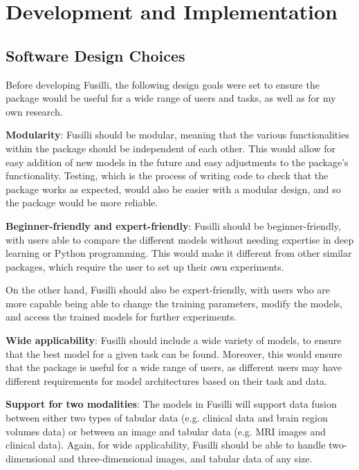 \section{Development and Implementation}

\subsection{Software Design Choices}

Before developing Fusilli, the following design goals were set to ensure the package would be useful for a wide range of users and tasks, as well as for my own research.
\vspace{0.3cm}

\noindent\textbf{Modularity}: Fusilli should be modular, meaning that the various functionalities within the package should be independent of each other.
This would allow for easy addition of new models in the future and easy adjustments to the package's functionality.
Testing, which is the process of writing code to check that the package works as expected, would also be easier with a modular design, and so the package would be more reliable.

\vspace{0.3cm}

\noindent\textbf{Beginner-friendly and expert-friendly}:  Fusilli should be beginner-friendly, with users able to compare the different models without needing expertise in deep learning or Python programming.
This would make it different from other similar packages, which require the user to set up their own experiments.

On the other hand, Fusilli should also be expert-friendly, with users who are more capable being able to change the training parameters, modify the models, and access the trained models for further experiments.

\vspace{0.3cm}

\noindent\textbf{Wide applicability}:
Fusilli should include a wide variety of models, to ensure that the best model for a given task can be found.
Moreover, this would ensure that the package is useful for a wide range of users, as different users may have different requirements for model architectures based on their task and data.

\vspace{0.3cm}

\noindent\textbf{Support for two modalities}: The models in Fusilli will support data fusion between either two types of tabular data (e.g. clinical data and brain region volumes data) or between an image and tabular data (e.g. MRI images and clinical data).
Again, for wide applicability, Fusilli should be able to handle two-dimensional and three-dimensional images, and tabular data of any size.

